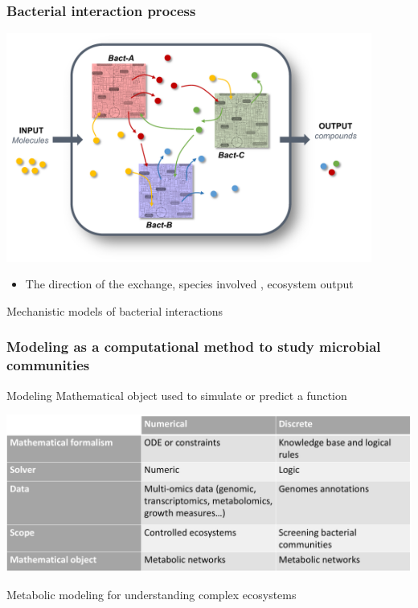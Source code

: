 \documentclass[8pt,usenames,dvipsnames]{beamer}
\begin{document}
\begin{frame}
\frametitle{Bacterial interaction process}
\centering
\includegraphics[width=0.9\textwidth]{figures/interactions.pdf}
\begin{itemize}
\item The direction of the exchange, species involved , ecosystem output
\end{itemize}

\begin{alertblock}{}
\centering
Mechanistic models of bacterial interactions
\end{alertblock}
\end{frame}


\begin{frame}
\frametitle{Modeling as a computational method to study microbial communities}
\begin{exampleblock}{Modeling}
Mathematical object used to simulate or predict a function
\end{exampleblock}

\includegraphics[width=\textwidth]{figures/modeling.pdf}

\begin{alertblock}{}
\centering
Metabolic modeling for understanding complex ecosystems
\end{alertblock}
\end{frame}
\end{document}

